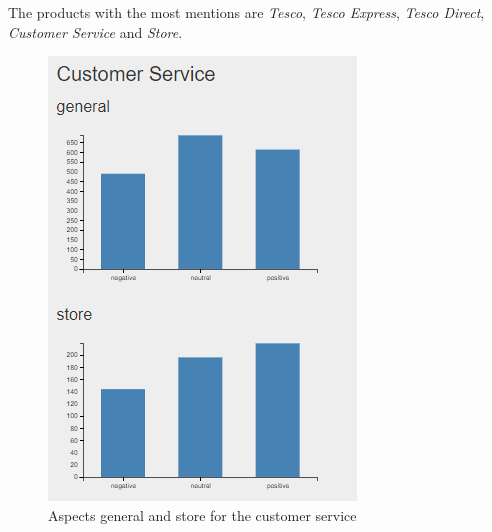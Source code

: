 \documentclass[10pt,a4paper]{article}
\begin{document}
				
		The products with the most mentions are \textit{Tesco}, \textit{Tesco Express}, \textit{Tesco Direct}, \textit{Customer Service} and \textit{Store}.
		
		\FloatBarrier
		\begin{figure}[!h]
  \centering
  \begin{minipage}[b]{0.455\textwidth}
    \includegraphics[width=\textwidth]{data/custService1}
    \caption{ Aspects general and store for the customer service}
	\label{fig:custServ1}
  \end{minipage}
  \hfill
  \begin{minipage}[b]{0.48\textwidth}

\end{minipage}
\end{figure}
\end{document}
